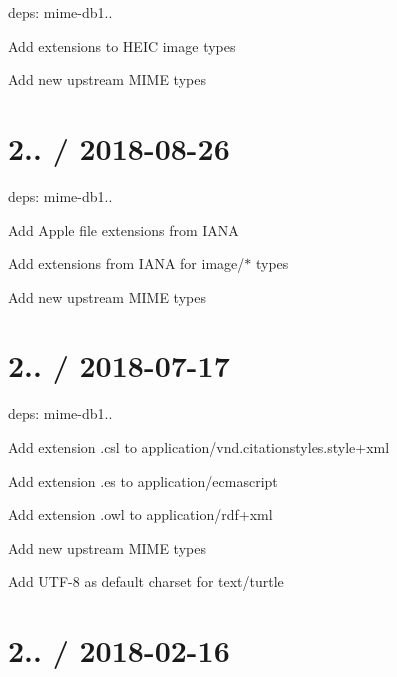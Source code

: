 
\begin{DoxyItemize}
\item deps\+: mime-\/db1..
\begin{DoxyItemize}
\item Add extensions to H\+E\+IC image types
\item Add new upstream M\+I\+ME types
\end{DoxyItemize}
\end{DoxyItemize}

\section*{2.. / 2018-\/08-\/26 }


\begin{DoxyItemize}
\item deps\+: mime-\/db1..
\begin{DoxyItemize}
\item Add Apple file extensions from I\+A\+NA
\item Add extensions from I\+A\+NA for {\ttfamily image/$\ast$} types
\item Add new upstream M\+I\+ME types
\end{DoxyItemize}
\end{DoxyItemize}

\section*{2.. / 2018-\/07-\/17 }


\begin{DoxyItemize}
\item deps\+: mime-\/db1..
\begin{DoxyItemize}
\item Add extension {\ttfamily .csl} to {\ttfamily application/vnd.\+citationstyles.\+style+xml}
\item Add extension {\ttfamily .es} to {\ttfamily application/ecmascript}
\item Add extension {\ttfamily .owl} to {\ttfamily application/rdf+xml}
\item Add new upstream M\+I\+ME types
\item Add U\+T\+F-\/8 as default charset for {\ttfamily text/turtle}
\end{DoxyItemize}
\end{DoxyItemize}

\section*{2.. / 2018-\/02-\/16 }


